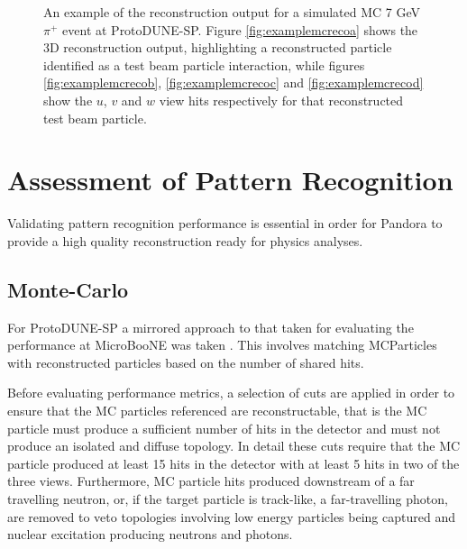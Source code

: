 \begin{figure}
\caption{An example of the reconstruction output for a simulated MC 7 GeV $\pi^{+}$ event at ProtoDUNE-SP.  Figure \ref{fig:examplemcrecoa} shows the 3D reconstruction output, highlighting a reconstructed particle identified as a test beam particle interaction, while figures \ref{fig:examplemcrecob}, \ref{fig:examplemcrecoc} and \ref{fig:examplemcrecod} show the $u$, $v$ and $w$ view hits respectively for that reconstructed test beam particle.}
\label{fig:examplemcreco}
\end{figure}

\section{Assessment of Pattern Recognition}
\label{sec:assesmentpatrec}
Validating pattern recognition performance is essential in order for Pandora to provide a high quality reconstruction ready for physics analyses.  

\subsection{Monte-Carlo}
\label{sec:mcmetrics}
For ProtoDUNE-SP a mirrored approach to that taken for evaluating the performance at MicroBooNE was taken \cite{pandorauboone}.  This involves matching MCParticles with reconstructed particles based on the number of shared hits.  


Before evaluating performance metrics, a selection of cuts are applied in order to ensure that the MC particles referenced are reconstructable, that is the MC particle must produce a sufficient number of hits in the detector and must not produce an isolated and diffuse topology.  In detail these cuts require that the MC particle produced at least 15 hits in the detector with at least 5 hits in two of the three views.  Furthermore, MC particle hits produced downstream of a far travelling neutron, or, if the target particle is track-like, a far-travelling photon, are removed to veto topologies involving low energy particles being captured and nuclear excitation producing neutrons and photons.

